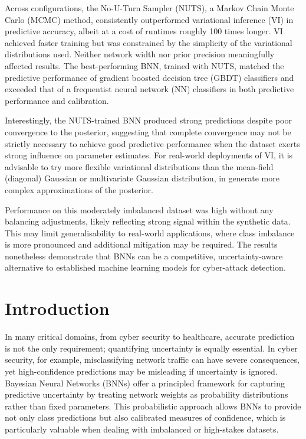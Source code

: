 \documentclass[
  a4paper,
]{scrreprt}
\begin{document}
Across configurations, the No-U-Turn Sampler (NUTS), a Markov Chain
Monte Carlo (MCMC) method, consistently outperformed variational
inference (VI) in predictive accuracy, albeit at a cost of runtimes
roughly 100 times longer. VI achieved faster training but was
constrained by the simplicity of the variational distributions used.
Neither network width nor prior precision meaningfully affected results.
The best-performing BNN, trained with NUTS, matched the predictive
performance of gradient boosted decision tree (GBDT) classifiers and
exceeded that of a frequentist neural network (NN) classifiers in both
predictive performance and calibration.

Interestingly, the NUTS-trained BNN produced strong predictions despite
poor convergence to the posterior, suggesting that complete convergence
may not be strictly necessary to achieve good predictive performance
when the dataset exerts strong influence on parameter estimates. For
real-world deployments of VI, it is advisable to try more flexible
variational distributions than the mean-field (diagonal) Gaussian or
multivariate Gaussian distribution, in generate more complex
approximations of the posterior.

Performance on this moderately imbalanced dataset was high without any
balancing adjustments, likely reflecting strong signal within the
synthetic data. This may limit generalisability to real-world
applications, where class imbalance is more pronounced and additional
mitigation may be required. The results nonetheless demonstrate that
BNNs can be a competitive, uncertainty-aware alternative to established
machine learning models for cyber-attack detection.


\chapter{Introduction}\label{introduction}

In many critical domains, from cyber security to healthcare, accurate
prediction is not the only requirement; quantifying uncertainty is
equally essential. In cyber security, for example, misclassifying
network traffic can have severe consequences, yet high-confidence
predictions may be misleading if uncertainty is ignored. Bayesian Neural
Networks (BNNs) offer a principled framework for capturing predictive
uncertainty by treating network weights as probability distributions
rather than fixed parameters. This probabilistic approach allows BNNs to
provide not only class predictions but also calibrated measures of
confidence, which is particularly valuable when dealing with imbalanced
or high-stakes datasets.
\end{document}
